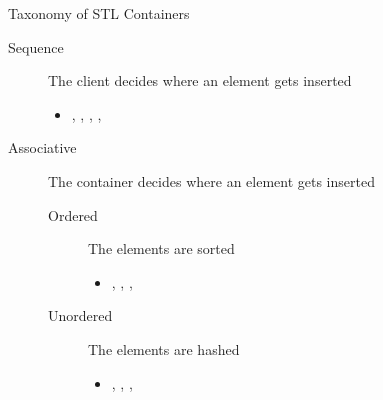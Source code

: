 \begin{frame}{Taxonomy of STL Containers}

  \begin{description}
  \item[Sequence] The client decides where an element gets inserted
    \begin{itemize}
    \item \textbf{}, , ,
      , \textbf{}
    \end{itemize}
  \item[Associative] The container decides where an element gets
    inserted
    \begin{description}
    \item[Ordered] The elements are sorted
      \begin{itemize}
      \item \textbf{}, , , 
      \end{itemize}
    \item[Unordered] The elements are hashed
      \begin{itemize}
      \item {}, ,
        , 
      \end{itemize}
    \end{description}
  \end{description}

\end{frame}

